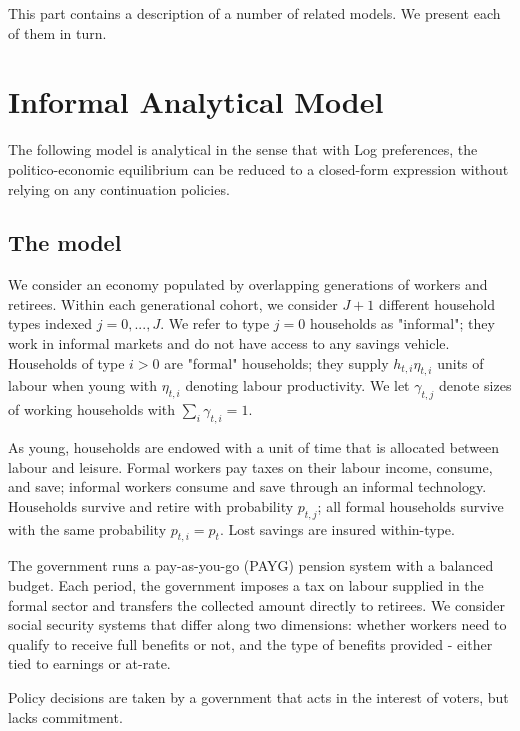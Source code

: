 \documentclass[a4paper]{article}
\begin{document}
This part contains a description of a number of related models. We present each of them in turn.



\edef\refsec{sec:models:infana}
\edef\refeq{eq:models:infana}


\section{Informal Analytical Model}\label{\refsec}
The following model is analytical in the sense that with Log preferences, the politico-economic equilibrium can be reduced to a closed-form expression without relying on any continuation policies. 

\subsection{The model}\label{\refsec:model}
We consider an economy populated by overlapping generations of workers and retirees. Within each generational cohort, we consider $J+1$ different household types indexed $j= 0,...,J$. We refer to type $j=0$ households as "informal"; they work in informal markets and do not have access to any savings vehicle. Households of type $i>0$ are "formal" households; they supply $h_{t,i}\eta_{t,i}$ units of labour when young with $\eta_{t,i}$ denoting labour productivity. We let $\gamma_{t,j}$ denote sizes of working households with $\sum_i \gamma_{t,i} = 1$.

As young, households are endowed with a unit of time that is allocated between labour and leisure. Formal workers pay taxes on their labour income, consume, and save; informal workers consume and save through an informal technology. Households survive and retire with probability $p_{t,j}$; all formal households survive with the same probability $p_
{t,i}= p_t$. Lost savings are insured within-type.

The government runs a pay-as-you-go (PAYG) pension system with a balanced budget. Each period, the government imposes a tax on labour supplied in the formal sector and transfers the collected amount directly to retirees. We consider social security systems that differ along two dimensions: whether workers need to qualify to receive full benefits or not, and the type of benefits provided - either tied to earnings or 
at-rate.

Policy decisions are taken by a government that acts in the interest of voters, but lacks commitment. 
\end{document}
